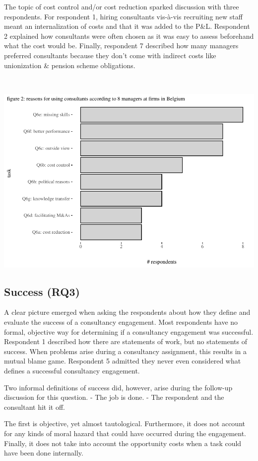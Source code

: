 \documentclass[12pt]{article}
\begin{document}
The topic of cost control and/or cost reduction sparked discussion with
three respondents. For respondent 1, hiring consultants vis-à-vis
recruiting new staff meant an internalization of costs and that it was
added to the P\&L. Respondent 2 explained how consultants were often
chosen as it was easy to assess beforehand what the cost would be.
Finally, respondent 7 described how many managers preferred consultants
because they don't come with indirect costs like unionization \& pension
scheme obligations.

\(~\)

\begin{center}\includegraphics[width=0.75\linewidth]{2_ams_five_pager_files/figure-latex/unnamed-chunk-3-1} \end{center}

\subsection{Success (RQ3)}\label{success-rq3}

A clear picture emerged when asking the respondents about how they
define and evaluate the success of a consultancy engagement. Most
respondents have no formal, objective way for determining if a
consultancy engagement was successful. Respondent 1 described how there
are statements of work, but no statements of success. When problems
arise during a consultancy assignment, this results in a mutual blame
game. Respondent 5 admitted they never even considered what defines a
successful consultancy engagement.

Two informal definitions of success did, however, arise during the
follow-up discussion for this question. - The job is done. - The
respondent and the consultant hit it off.

The first is objective, yet almost tautological. Furthermore, it does
not account for any kinds of moral hazard that could have occurred
during the engagement. Finally, it does not take into account the
opportunity costs when a task could have been done internally.
\end{document}
